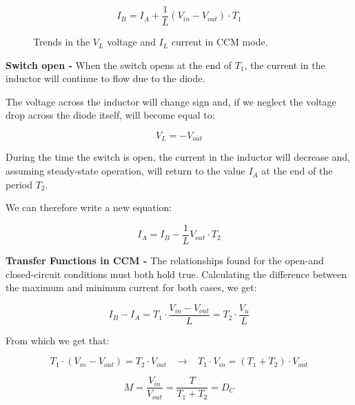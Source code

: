 \documentclass[../main.tex]{subfiles}
\begin{document}
\begin{equation}
	I_B = I_A + \frac{1}{L} (V_{in} - V_{out}) \cdot T_1
\end{equation}


\begin{figure}[h!]
\begin{center}



\label{currentvoltagebuck}
\caption{Trends in the $V_L$ voltage and $I_L$ current in CCM mode.}	
\end{center}	
\end{figure}

\textbf{Switch open -} When the switch opens at the end of $T_1$, the current in the inductor will continue to flow due to the diode. 

The voltage across the inductor will change sign and, if we neglect the voltage drop across the diode itself, will become equal to:

\begin{equation}
	V_L = -V_{out}
\end{equation}

During the time the switch is open, the current in the inductor will decrease and, assuming steady-state operation, will return to the value $I_A$ at the end of the period $T_2$. 

We can therefore write a new equation:

\begin{equation}
	I_A = I_B - \frac{1}{L} V_{out} \cdot T_2
\end{equation}


\textbf{Transfer Functions in CCM -} The relationships found for the open-and closed-circuit conditions must both hold true. 
Calculating the difference between the maximum and minimum current for both cases, we get:

\begin{equation}
	I_B - I_A = T_1 \cdot \frac{V_{in} - V_{out}}{L} = T_2 \cdot \frac{V_u}{L}
\end{equation}

From which we get that:

\begin{equation}
	T_1 \cdot (V_{in} - V_{out}) = T_2 \cdot V_{out} \hspace{10pt} \longrightarrow \hspace{10pt} T_1 \cdot V_{in} = (T_1 + T_2) \cdot V_{out}
\end{equation}

\begin{equation}
	M = \frac{V_{in}}{V_{out}} = \frac{T}{T_1 + T_2} = D_C
\end{equation}
\end{document}

